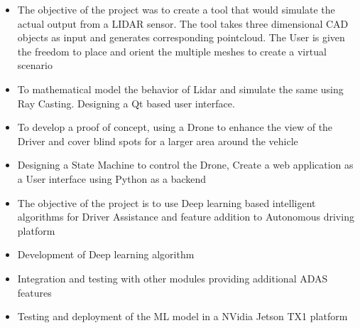 \documentclass[10pt,a4paper,ragged2e,withhyper]{altacv}
\begin{document}
\begin{itemize}

 \item  The objective of the project was to create a tool that would simulate the actual output from a LIDAR sensor. The tool takes three dimensional CAD objects as input and generates corresponding pointcloud. The User is given the freedom to place and orient the multiple meshes to create a virtual scenario

\item  To mathematical model the behavior of Lidar and simulate the same using Ray Casting. Designing a Qt based user interface.
\end{itemize}

\divider


\begin{itemize}
 \item  To develop a proof of concept, using a Drone to enhance the view of the Driver and cover blind spots for a larger area around the vehicle

 \item  Designing a State Machine to control the Drone, Create a web application as a User interface using Python as a backend
\end{itemize}

\divider


  \begin{itemize}
\item The objective of the project is to use Deep learning based intelligent algorithms for Driver Assistance and feature addition to Autonomous driving platform
  \item Development of Deep learning algorithm
 \item  Integration and testing with other modules providing additional ADAS features
\item  Testing and deployment of the ML model in a NVidia Jetson TX1 platform
  \end{itemize}
\end{document}
